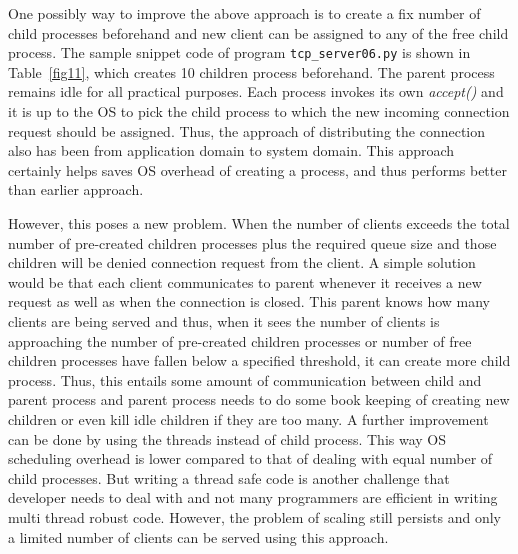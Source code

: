 \begin{multicols}{2}
One possibly way to improve the above approach is to create a fix number of child processes beforehand and new client can be assigned to any of the free child process. The sample snippet code of program \texttt{tcp\_server06.py}\cite{art1-key04} is shown in Table~\ref{fig11}, which creates 10 children process beforehand. The parent process remains idle for all practical purposes. Each process invokes its own \textit{accept()} and it is up to the OS to pick the child process to which the new incoming connection request should be assigned.  Thus, the approach of distributing the connection also has been from application domain to system domain. This approach certainly helps saves OS overhead of creating a process, and thus performs better than earlier approach.

However, this poses a new problem. When the number of clients exceeds the total number of pre-created children processes plus the required queue size and those children will be denied connection request from the client. A simple solution would be that each client communicates to parent whenever it receives a new request as well as when the connection is closed. This parent knows how many clients are being served and thus, when it sees the number of clients is approaching the number of pre-created children processes or number of free children processes have fallen below a specified threshold, it can create more child process. Thus, this entails some amount of communication between child and parent process and parent process needs to do some book keeping of creating new children or even kill idle children if they are too many. A further improvement can be done by using the threads instead of child process. This way OS scheduling overhead is lower compared to that of dealing with equal number of child processes. But writing a thread safe code is another challenge that developer needs to deal with and not many programmers are efficient in writing multi thread robust code. However, the problem of scaling still persists and only a limited number of clients can be served using this approach. 
\end{multicols}

